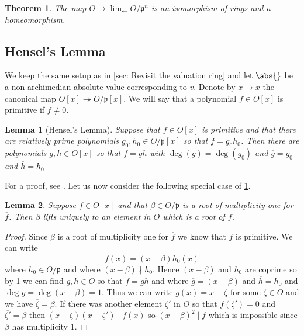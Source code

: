 \documentclass{article}
\newtheorem{theorem}{Theorem}[section]
\newtheorem{lemma}{Lemma}[section]
\newcommand{\mfrak}[1]{\mathfrak{#1}}
\numberwithin{equation}{section}
\begin{document}
\begin{theorem}\label{thm: Isomorphism of projective limit and ring of integers}
	The map $O \to \lim_{\leftarrow} O / \mfrak p^n$ is an isomorphism of rings and a homeomorphism.
\end{theorem}

\subsection{Hensel's Lemma}
We keep the same setup as in \cref{sec: Revisit the valuation ring} and let $\abs{}$ be a non-archimedian absolute value corresponding to $v$. Denote by $x \mapsto \overline{x}$ the canonical map $O[x] \twoheadrightarrow O / \mfrak p[x]$. We will say that a polynomial $f \in O[x]$ is primitive if $\overline f \neq 0$.

\begin{lemma}[Hensel's Lemma]\label{lem: Hensel lemma}
	Suppose that $f \in O[x]$ is primitive and that there are relatively prime polynomials $g_0,h_0 \in O/\mfrak p[x]$ so that $\overline f = g_0 h_0$. Then there are polynomials $g,h \in O[x]$ so that $f = gh$ with $\deg(g) = \deg(g_0)$ and $\overline g = g_0$ and $\overline h = h_0$
\end{lemma}
For a proof, see \citep[4.6]{neukirch}. Let us now consider the following special case of \cref{lem: Hensel lemma}.
\begin{lemma} \label{lem: Root lifting}
	Suppose $f \in O[x]$ and that $\beta \in O/\mfrak p$ is a root of multiplicity one for $\overline f$. Then $\beta$ lifts uniquely to an element in $O$ which is a root of $f$.
\end{lemma}
\begin{proof}
	Since $\beta$ is a root of multiplicity one for $\overline f$ we know that $f$ is primitive. We can write
	$$\overline f(x) = (x - \beta)h_0(x)$$
	where $h_0 \in O/\mfrak p$ and where $(x-\beta) \nmid h_0$. Hence $(x-\beta)$ and $h_0$ are coprime so by \cref{lem: Hensel lemma} we can find $g,h \in O$ so that $f = g h$ and where $\overline g = (x-\beta)$ and $\overline h = h_0$ and $\deg g = \deg (x - \beta) = 1$. Thus we can write $g(x) = x - \zeta$ for some $\zeta \in O$ and we have $\overline \zeta = \beta$. If there was another element $\zeta'$ in $O$ so that $f(\zeta') = 0$ and $\overline {\zeta'} = \beta$ then $(x-\zeta)(x-\zeta') \mid f(x)$ so $(x-\beta)^2 \mid  \overline f$ which is impossible since $\beta$ has multiplicity 1.
\end{proof}
 
\end{document}
